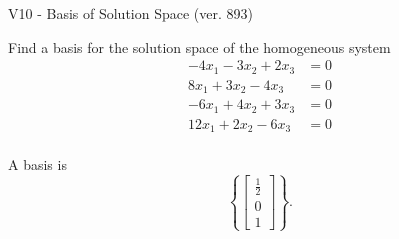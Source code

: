 \begin{exercise}
  \begin{exerciseTitle}V10 - Basis of Solution Space (ver. 893)\end{exerciseTitle}
  \begin{exerciseStatement}
    Find a basis for the solution space of the homogeneous system 
\begin{align*}
 -4 x_ 1 -3 x_ 2 + 2 x_ 3 &= 0  \\ 
  8 x_ 1 + 3 x_ 2 -4 x_ 3 &= 0  \\ 
  -6 x_ 1 + 4 x_ 2 + 3 x_ 3 &= 0  \\ 
  12 x_ 1 + 2 x_ 2 -6 x_ 3 &= 0  \\ 
 \end{align*}


 
  \end{exerciseStatement}

  \begin{exerciseAnswer}
   A basis is   
\[\left\{\left[\begin{array}{c}
\frac{1}{2} \\
0 \\
1
\end{array}\right]\right\}.\]

  


  \end{exerciseAnswer}
\end{exercise}